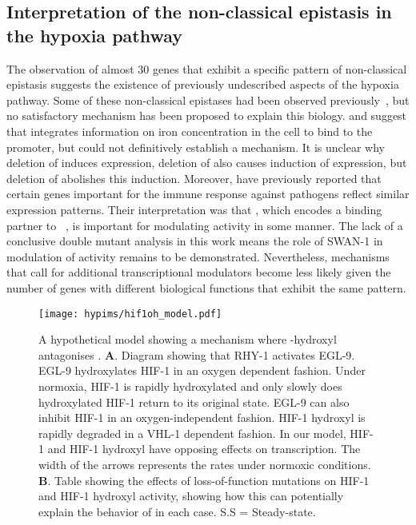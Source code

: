 \subsection*{Interpretation of the non-classical epistasis in the hypoxia pathway}
The observation of almost 30 genes that exhibit a specific pattern of non-classical
epistasis suggests the existence of previously undescribed aspects of the hypoxia
pathway. Some of these non-classical epistases had been observed
previously~\citep{Ackerman2012,Romney2011,Luhachack2012}, but
no satisfactory mechanism has been proposed to explain this biology.
\citet{Romney2011} and \citet{Ackerman2012}
suggest that \hifp{} integrates information on iron concentration in the
cell to bind to the \ftna{} promoter, but could not definitively establish
a mechanism.
It is unclear why deletion of  induces \ftna{}
expression, deletion of  also causes induction of \ftna{} expression,
but deletion of  abolishes this induction. Moreover, \citet{Luhachack2012}
have previously reported that certain genes important for the \cel{} immune response
against pathogens reflect similar expression patterns. Their interpretation
was that , which encodes a binding partner to \eglp{}~\citep{Shao2010},
is important for modulating \hifp{} activity in some manner. The lack of a
conclusive double mutant analysis in this work means the role of SWAN-1 in
modulation of \hifp{} activity remains to be demonstrated. Nevertheless, mechanisms
that call for additional transcriptional modulators become less likely given the
number of genes with different biological functions that exhibit the same pattern.

\begin{figure}[tbhp]
\centering
\texttt{[image: hypims/hif1oh\_model.pdf]}
\caption{
A hypothetical model showing a mechanism where \hifp{}-hydroxyl antagonises
\hifp{}.
\textbf{A}. Diagram showing that RHY-1 activates EGL-9.
EGL-9 hydroxylates HIF-1 in an oxygen dependent fashion. Under normoxia, HIF-1
is rapidly hydroxylated and only slowly does hydroxylated HIF-1 return to its
original state. EGL-9 can also inhibit HIF-1 in an oxygen-independent fashion.
HIF-1 hydroxyl is rapidly degraded in a VHL-1 dependent fashion. In our model,
HIF-1 and HIF-1 hydroxyl have opposing effects on transcription. The width of the
arrows represents the rates under normoxic conditions.
\textbf{B}. Table showing the effects of loss-of-function mutations on HIF-1 and
HIF-1 hydroxyl activity, showing how this can potentially explain the behavior
of  in each case.  S.S = Steady-state.
}
\label{fig:hif1oh_table}
\end{figure}

